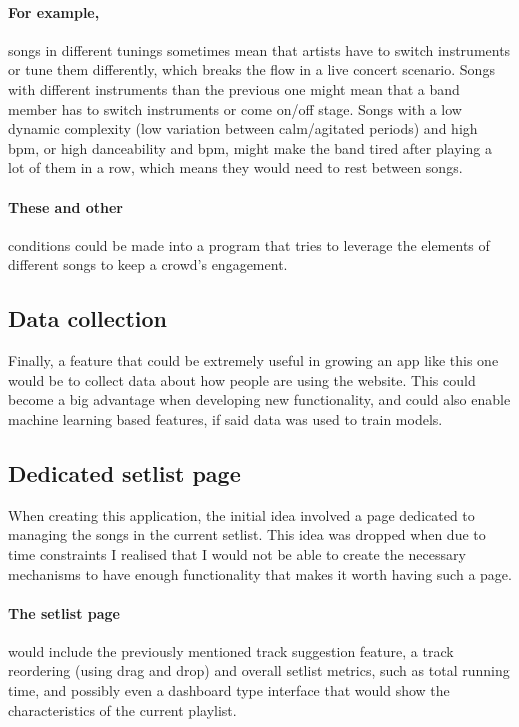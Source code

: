 \documentclass[10pt, a4paper]{article}
\begin{document}
        \paragraph{For example,} songs in different tunings sometimes mean that artists have to switch instruments or tune them differently, which breaks the flow in a live concert scenario.
        Songs with different instruments than the previous one might mean that a band member has to switch instruments or come on/off stage.
        Songs with a low dynamic complexity (low variation between calm/agitated periods) and high bpm, or high danceability and bpm, might make the band tired after playing a lot of them in a row, which means they would need to rest between songs.
        \paragraph{These and other} conditions could be made into a program that tries to leverage the elements of different songs to keep a crowd's engagement.

        \subsection{Data collection}
        Finally, a feature that could be extremely useful in growing an app like this one would be to collect data about how people are using the website. This could become a big advantage when developing new functionality, and could also enable machine learning based features, if said data was used to train models.

        \subsection{Dedicated setlist page}
        When creating this application, the initial idea involved a page dedicated to managing the songs in the current setlist. This idea was dropped when due to time constraints I realised that I would not be able to create the necessary mechanisms to have enough functionality that makes it worth having such a page.
        \paragraph{The setlist page} would include the previously mentioned track suggestion feature, a track reordering (using drag and drop) and overall setlist metrics, such as total running time, and possibly even a dashboard type interface that would show the characteristics of the current playlist.
\end{document}
